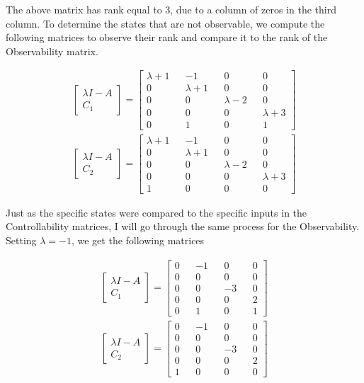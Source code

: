 \documentclass[paper=a4,margin, fontsize=11pt]{scrartcl} %
\numberwithin{equation}{section} %
\numberwithin{figure}{section} %
\numberwithin{table}{section} %
\begin{document}
The above matrix has rank equal to 3, due to a column of zeros in the third column.  To determine the states that are not observable, we compute the following matrices to observe their rank and compare it to the rank of the Observability matrix.

\begin{align*}
\begin{bmatrix} \lambda I-A \\ C_1 \end{bmatrix}=\begin{bmatrix} \lambda+1 && -1 && 0 && 0\\0 && \lambda+1 && 0 && 0\\0 && 0 && \lambda-2 && 0\\0 && 0 && 0 && \lambda+3\\ 0 && 1 && 0 && 1 \end{bmatrix}
\\
\begin{bmatrix}\lambda I-A \\ C_2 \end{bmatrix}=\begin{bmatrix} \lambda+1 && -1 && 0 && 0\\0 && \lambda+1 && 0 && 0\\0 && 0 && \lambda-2 && 0\\0 && 0 && 0 && \lambda+3\\ 1 && 0 && 0 && 0 \end{bmatrix}
\end{align*}  

Just as the specific states were compared to the specific inputs in the Controllability matrices, I will go through the same process for the Observability.\\
Setting $\lambda=-1$, we get the following matrices

\begin{align*}
\begin{bmatrix} \lambda I-A \\ C_1 \end{bmatrix}=\begin{bmatrix} 0 && -1 && 0 && 0\\0 && 0 && 0 && 0\\0 && 0 && -3 && 0\\0 && 0 && 0 && 2\\ 0 && 1 && 0 && 1 \end{bmatrix}
\\
\begin{bmatrix}\lambda I-A \\ C_2 \end{bmatrix}=\begin{bmatrix} 0 && -1 && 0 && 0\\0 && 0 && 0 && 0\\0 && 0 && -3 && 0\\0 && 0 && 0 && 2\\ 1 && 0 && 0 && 0 \end{bmatrix}
\end{align*}  
\end{document}

